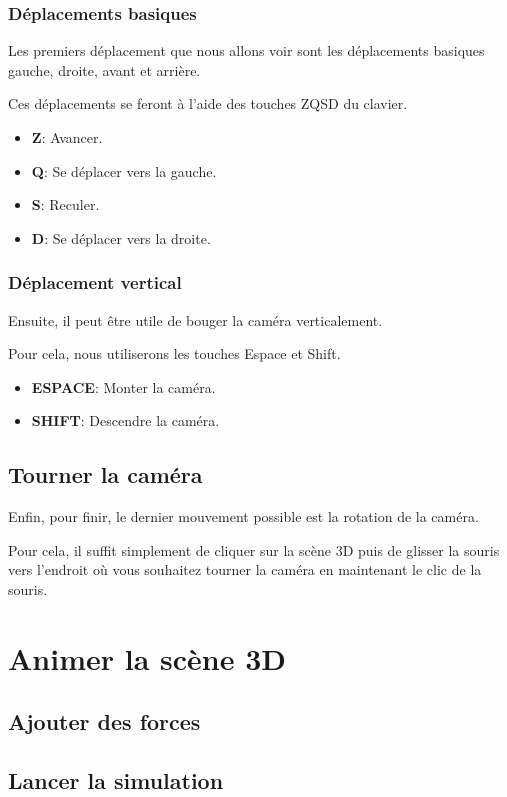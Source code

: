 \documentclass[11pt]{report}
\begin{document}
\subsection{Déplacements basiques}

\hypertarget{move}{Les premiers déplacement que nous allons voir sont les déplacements basiques gauche, droite, avant et arrière.} Ces déplacements se feront à l'aide des touches ZQSD du clavier.

\begin{itemize}
  \item \textbf{Z}: Avancer.
  \item \textbf{Q}: Se déplacer vers la gauche.
  \item \textbf{S}: Reculer.
  \item \textbf{D}: Se déplacer vers la droite.
\end{itemize}

\subsection{Déplacement vertical}

\hypertarget{moveV}{Ensuite, il peut être utile de bouger la caméra verticalement.} Pour cela, nous utiliserons les touches Espace et Shift.

\begin{itemize}
  \item \textbf{ESPACE}: Monter la caméra.
  \item \textbf{SHIFT}: Descendre la caméra.
\end{itemize}

\section{Tourner la caméra}

\hypertarget{rotate}{Enfin, pour finir, le dernier mouvement possible est la rotation de la caméra.} Pour cela, il suffit simplement de cliquer sur la scène 3D puis de glisser la souris vers l'endroit où vous souhaitez tourner la caméra en maintenant le clic de la souris.


\chapter{Animer la scène 3D}

\section{Ajouter des forces}

\section{Lancer la simulation}
\end{document}
